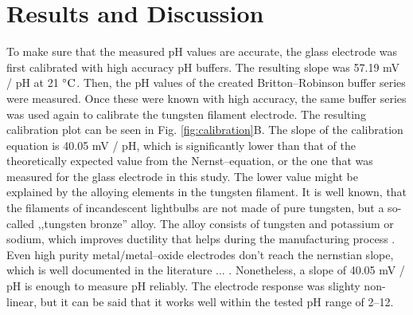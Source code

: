 \documentclass[manuscript=article, journal=jceda8]{achemso}
\begin{document}
\section{Results and Discussion}

To make sure that the measured pH values are accurate, the glass electrode was first calibrated with high accuracy pH buffers. The resulting slope was 57.19 mV / pH at 21 $\celsius$. Then, the pH values of the created Britton--Robinson buffer series were measured. Once these were known with high accuracy, the same buffer series was used again to calibrate the tungsten filament electrode. The resulting calibration plot can be seen in Fig. \ref{fig:calibration}B. The slope of the calibration equation is 40.05 mV / pH, which is significantly lower than that of the theoretically expected value from the Nernst--equation, or the one that was measured for the glass electrode in this study. The lower value might be explained by the alloying elements in the tungsten filament. It is well known, that the filaments of incandescent lightbulbs are not made of pure tungsten, but a so-called ,,tungsten bronze'' alloy. The alloy consists of tungsten and potassium or sodium, which improves ductility that helps during the manufacturing process \cite{cisternas2015electrode, wechter1972use, schade2010100}. Even high purity metal/metal--oxide electrodes don't reach the nernstian slope, which is well documented in the literature ... . Nonetheless, a slope of 40.05 mV / pH is enough to measure pH reliably. The electrode response was slighty non-linear, but it can be said that it works well within the tested pH range of 2--12.
\end{document}

